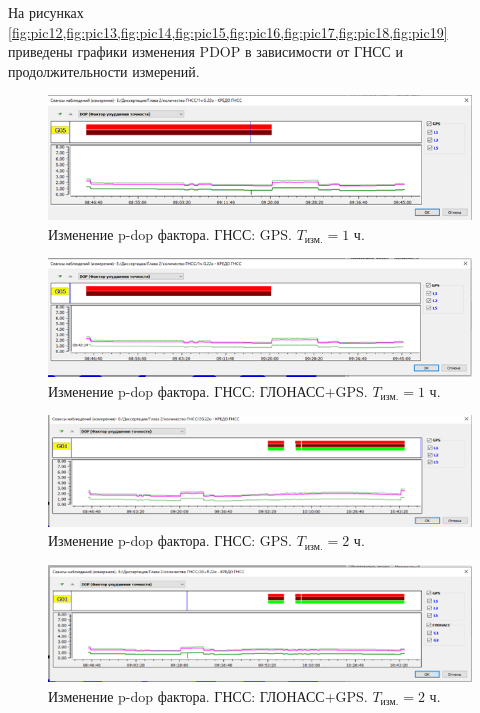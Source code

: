 На рисунках \cref{fig:pic12,fig:pic13,fig:pic14,fig:pic15,fig:pic16,fig:pic17,fig:pic18,fig:pic19} приведены графики изменения PDOP в зависимости от ГНСС и продолжительности измерений.	


\begin{figure}[!h]
	\centering
	\includegraphics[width=0.99\linewidth]{images/pic12}
	\caption{Изменение p-dop фактора. ГНСС: GPS. $T_{\text{изм.}}=1$ ч. }
	\label{fig:pic12}
\end{figure}

\begin{figure}[!h]
	\centering
	\includegraphics[width=0.99\linewidth]{images/pic13}
	\caption{Изменение p-dop фактора. ГНСС: ГЛОНАСС\thinspace +\thinspace GPS. $T_{\text{изм.}}=1$ ч. }
	\label{fig:pic13}
\end{figure}

\begin{figure}[!h]
	\centering
	\includegraphics[width=0.99\linewidth]{images/pic14}
	\caption{Изменение p-dop фактора. ГНСС: GPS. $T_{\text{изм.}}=2$ ч. }
	\label{fig:pic14}
\end{figure}

\begin{figure}[!h]
	\centering
	\includegraphics[width=0.99\linewidth]{images/pic15}
	\caption{Изменение p-dop фактора. ГНСС: ГЛОНАСС\thinspace +\thinspace GPS. $T_{\text{изм.}}=2$ ч. }
	\label{fig:pic15}
\end{figure}

